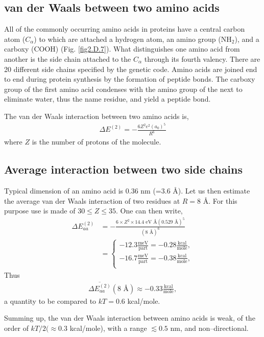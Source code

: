 \begin{subappendices}
 \subsection{van der Waals between two amino acids}
 All of the commonly occurring amino acids in proteins have a central carbon atom ($C_\alpha$) to which are attached a hydrogen atom, an amino group (NH$_2$), and a carboxy (COOH) (Fig. \ref{fig2.D.7}). What distinguishes one amino acid from another is the side chain attached to the $C_\alpha$ through its fourth valency. There are 20 different side chains specified by the genetic code.
 Amino acids are joined end to end during protein synthesis by the formation of peptide bonds. The carboxy group of the first amino acid condenses with the amino group of the next to eliminate water, thus the name residue, and yield a peptide bond.
 
 
 The van der Waals interaction between two amino acids is,
   \begin{align}\label{eq2.D.26}
\Delta E^{(2)}=-\frac{6Z^2e^2(a_0)^5}{R^6}
   \end{align} 
 where $Z$ is the number of protons of the molecule.
 \subsection{Average interaction between two side chains}
 Typical dimension of an amino acid is 0.36 nm (=3.6 \AA). Let us then estimate the average van der Waals interaction of two residues at $R=8$ \AA. For this purpose use is made of $30\leq Z\leq 35$. One can then write,
   \begin{align}\label{eq2.D.27}
\nonumber \Delta E_{aa}^{(2)}&=-\frac{6\times Z^2\times 14.4\text{ eV \AA} (0.529\text{ \AA})^5}{(8\text{ \AA})^6}\\
&=\left\{\begin{array}{c}
 -12.3\frac{\text{meV}}{\text{part}}=-0.28\frac{\text{kcal}}{\text{mole}},\\
  -16.7\frac{\text{meV}}{\text{part}}=-0.38\frac{\text{kcal}}{\text{mole}},\\
\end{array}\right. 
   \end{align} 
 Thus
    \begin{align}\label{eq2.D.28}
\overline{\Delta E_{aa}^{(2)}}(8\text{ \AA})\approx-0.33\frac{\text{kcal}}{\text{mole}},
    \end{align} 
 a quantity to be compared to $kT=0.6$ kcal/mole.
 
 Summing up, the van der Waals interaction between amino acids is weak, of the order of $kT/2(\approx0.3 $ kcal/mole), with a range $\lesssim0.5$ nm, and non--directional.
 

\end{subappendices}
